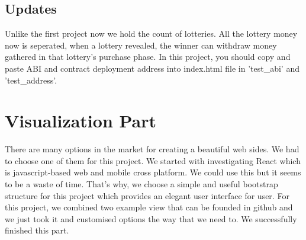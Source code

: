 \documentclass[]{scrreprt}
\begin{document}
	 \section{Updates}
	 	Unlike the first project now we hold the count of lotteries. All the lottery money now is seperated, when a lottery revealed, the winner can withdraw money gathered in that lottery's purchase phase. In this project, you should copy and paste ABI and contract deployment address into index.html file in 'test\_abi' and 'test\_address'.
	\chapter{Visualization Part}
		There are many options in the market for creating a beautiful web sides. We had to choose one of them for this project. We started with investigating React\cite{React} which is javascript-based web and mobile cross platform. We could use this but it seems to be a waste of time. That's why, we choose a simple and useful bootstrap structure for this project which provides an elegant user interface for user. For this project, we combined two example view that can be founded in github and we just took it and customised options the way that we need to. We successfully finished this part. 
\end{document}
